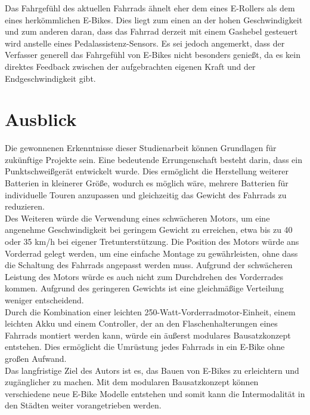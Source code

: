 Das Fahrgefühl des aktuellen Fahrrads ähnelt eher dem eines E-Rollers als dem eines herkömmlichen E-Bikes.
Dies liegt zum einen an der hohen Geschwindigkeit und zum anderen daran, dass das Fahrrad derzeit mit einem Gashebel gesteuert wird anstelle eines Pedalassistenz-Sensors.
Es sei jedoch angemerkt, dass der Verfasser generell das Fahrgefühl von E-Bikes nicht besonders genießt, da es kein direktes Feedback zwischen der aufgebrachten eigenen Kraft und der Endgeschwindigkeit gibt.\\

 \section{Ausblick}


Die gewonnenen Erkenntnisse dieser Studienarbeit können Grundlagen für zukünftige Projekte sein.
Eine bedeutende Errungenschaft besteht darin, dass ein Punktschweißgerät entwickelt wurde.
Dies ermöglicht die Herstellung weiterer Batterien in kleinerer Größe, wodurch es möglich wäre, mehrere Batterien für individuelle Touren anzupassen und gleichzeitig das Gewicht des Fahrrads zu reduzieren.\\

Des Weiteren würde die Verwendung eines schwächeren Motors, um eine angenehme Geschwindigkeit bei geringem Gewicht zu erreichen, etwa bis zu 40 oder 35 km/h bei eigener Tretunterstützung.
Die Position des Motors würde ans Vorderrad gelegt werden, um eine einfache Montage zu gewährleisten, ohne dass die Schaltung des Fahrrads angepasst werden muss.
Aufgrund der schwächeren Leistung des Motors würde es auch nicht zum Durchdrehen des Vorderrades kommen.
Aufgrund des geringeren Gewichts ist eine gleichmäßige Verteilung weniger entscheidend.\\


Durch die Kombination einer leichten 250-Watt-Vorderradmotor-Einheit, einem leichten Akku und einem Controller, der an den Flaschenhalterungen eines Fahrrads montiert werden kann, würde ein äußerst modulares Bausatzkonzept entstehen.
Dies ermöglicht die Umrüstung jedes Fahrrads in ein E-Bike ohne großen Aufwand.\\


Das langfristige Ziel des Autors ist es, das Bauen von E-Bikes zu erleichtern und zugänglicher zu machen.
Mit dem modularen Bausatzkonzept können verschiedene neue E-Bike Modelle entstehen und somit kann die Intermodalität in den Städten weiter vorangetrieben werden.













